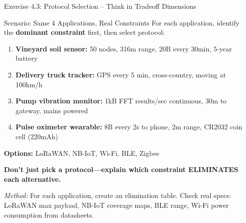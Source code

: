 \documentclass[aspectratio=169,11pt]{beamer}
\begin{document}
\begin{frame}{Exercise 4.3: Protocol Selection -- Think in Tradeoff Dimensions}
    \begin{block}{Scenario: Same 4 Applications, Real Constraints}
        For each application, identify the \textbf{dominant constraint} first, then select protocol:
        \begin{enumerate}
            \item \textbf{Vineyard soil sensor:} 50 nodes, 316m range, 20B every 30min, 5-year battery
            \item \textbf{Delivery truck tracker:} GPS every 5 min, cross-country, moving at 100km/h
            \item \textbf{Pump vibration monitor:} 1kB FFT results/sec continuous, 30m to gateway, mains powered
            \item \textbf{Pulse oximeter wearable:} 8B every 2s to phone, 2m range, CR2032 coin cell (220mAh)
        \end{enumerate}
        
        \textbf{Options:} LoRaWAN, NB-IoT, Wi-Fi, BLE, Zigbee
    \end{block}
    
    \textbf{Don't just pick a protocol---explain which constraint ELIMINATES each alternative.}
    
    \vspace{0.1cm}
    {\footnotesize \textit{Method:} For each application, create an elimination table. Check real specs: LoRaWAN max payload, NB-IoT coverage maps, BLE range, Wi-Fi power consumption from datasheets.}
\end{frame}
\end{document}
